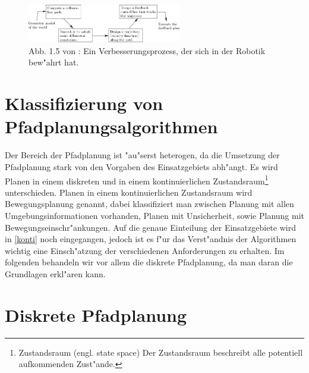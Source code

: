\begin{figure} %
	\centering
	\includegraphics[width=0.6\textwidth]{images/img247.png}
	\caption{Abb. 1.5 von \cite[~S. 20]{Lav06}:  Ein Verbesserungsprozess, der sich in der Robotik bew"ahrt hat.}
	\label{lav02}
\end{figure}

\section{Klassifizierung von Pfadplanungsalgorithmen} %
Der Bereich der Pfadplanung ist "au"serst heterogen, da die Umsetzung der Pfadplanung stark von den Vorgaben des Einsatzgebiets abh"angt. 
Es wird Planen in einem diskreten und in einem kontinuierlichen Zustandsraum\footnote{Zustandsraum (engl. state space) Der Zustandsraum beschreibt alle potentiell aufkommenden Zust"ande.} unterschieden. Planen in einem kontinuierlichen Zustandsraum wird Bewegungsplanung genannt, dabei klassifiziert man zwischen Planung mit allen Umgebungsinformationen vorhanden, Planen mit Unsicherheit, sowie Planung mit Bewegungseinschr"ankungen.
Auf die genaue Einteilung der Einsatzgebiete wird in \ref{konti} noch eingegangen, jedoch ist es f"ur das Verst"andnis der Algorithmen wichtig eine Einsch"atzung der verschiedenen Anforderungen zu erhalten. Im folgenden behandeln wir vor allem die diskrete Pfadplanung, da man daran die Grundlagen erkl"aren kann. \cite[~S. 24ff]{Lav06} 

\section{Diskrete Pfadplanung} \label{Kapitel 4.3} %

